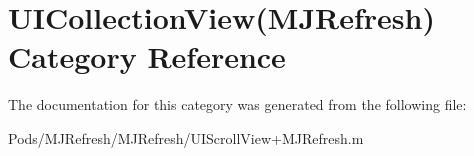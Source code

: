 \hypertarget{category_u_i_collection_view_07_m_j_refresh_08}{}\section{U\+I\+Collection\+View(M\+J\+Refresh) Category Reference}
\label{category_u_i_collection_view_07_m_j_refresh_08}


The documentation for this category was generated from the following file\+:\begin{DoxyCompactItemize}
\item 
Pods/\+M\+J\+Refresh/\+M\+J\+Refresh/U\+I\+Scroll\+View+\+M\+J\+Refresh.\+m\end{DoxyCompactItemize}
